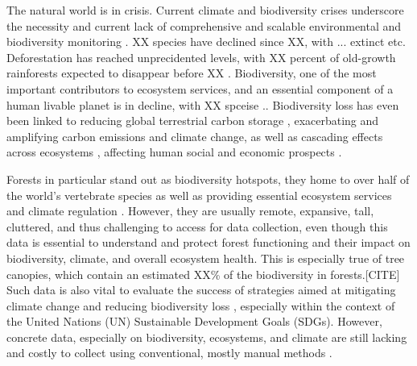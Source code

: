 The natural world is in crisis. Current climate and biodiversity crises \cite{Pereira2024, Weiskopf2024, Pimm2014, Portner2023} underscore the necessity and current lack of comprehensive and scalable environmental and biodiversity monitoring \cite{Gonzalez2023a, McRae2017, Gonzalez2016, Mora2011}. 
XX species have declined since XX, with ... extinct etc. Deforestation has reached unprecidented levels, with XX percent of old-growth rainforests expected to disappear before XX \cite{}.
Biodiversity, one of the most important contributors to ecosystem services, and an essential component of a human livable planet is in decline, with XX spceise ..
Biodiversity loss has even been linked to reducing global terrestrial carbon storage \cite{Weiskopf2024}, exacerbating and amplifying carbon emissions and climate change, as well as cascading effects across ecosystems \cite{Rosenberg2019, Ceballos2015}, affecting human social and economic prospects \cite{Frank2024, Portner2023}.

Forests in particular stand out as biodiversity hotspots, they home to over half of the world's vertebrate species \cite{Pillay2022} as well as providing essential ecosystem services and climate regulation \cite{Brockerhoff2017}. However, they are usually remote, expansive, tall, cluttered, and thus challenging to access for data collection, even though this data is essential to understand and protect forest functioning and their impact on biodiversity, climate, and overall ecosystem health. This is especially true of tree canopies, which contain an estimated XX\% of the biodiversity in forests.[CITE] Such data is also vital to evaluate the success of strategies aimed at mitigating climate change and reducing biodiversity loss \cite{Gonzalez2023}, especially within the context of the United Nations (UN) Sustainable Development Goals (SDGs). However, concrete data, especially on biodiversity, ecosystems, and climate are still lacking \cite{Goessmann2023} and costly to collect using conventional, mostly manual methods \cite{Cannon2021, UNEnvironment2019}. 

